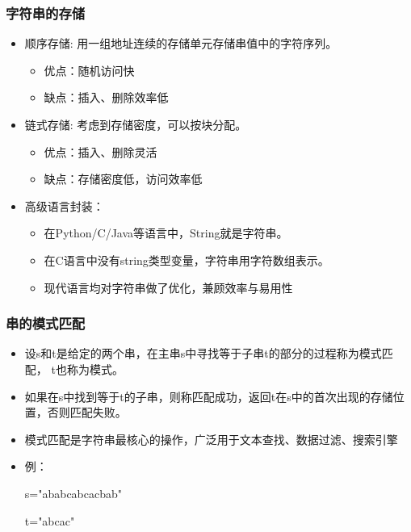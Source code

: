 \begin{frame}[fragile]
  \frametitle{字符串的存储}
  \begin{itemize}
  \item 顺序存储: 用一组地址连续的存储单元存储串值中的字符序列。
    \begin{itemize}
    \item 优点：随机访问快
    \item 缺点：插入、删除效率低
    \end{itemize}
  \item 链式存储: 考虑到存储密度，可以按块分配。
    \begin{itemize}
    \item 优点：插入、删除灵活
    \item 缺点：存储密度低，访问效率低
    \end{itemize}
  \item 高级语言封装：
    \begin{itemize}
    \item 在Python/C/Java等语言中，String就是字符串。
    \item 在C语言中没有string类型变量，字符串用字符数组表示。
    \item 现代语言均对字符串做了优化，兼顾效率与易用性
    \end{itemize}
  \end{itemize}
\end{frame}

\begin{frame}[fragile]
  \frametitle{串的模式匹配}
  \begin{itemize}
  \item 设s和t是给定的两个串，在主串s中寻找等于子串t的部分的过程称为模式匹配， t也称为模式。
  \item 如果在s中找到等于t的子串，则称匹配成功，返回t在s中的首次出现的存储位置，否则匹配失败。
  \item 模式匹配是字符串最核心的操作，广泛用于文本查找、数据过滤、搜索引擎
  \item 例：

    s="ababcabcacbab"

    t="abcac"
  \end{itemize}
\end{frame}

